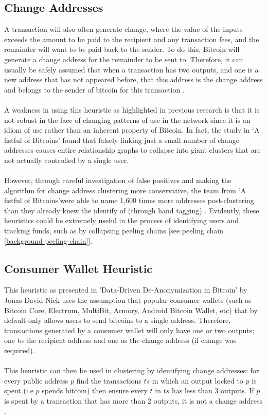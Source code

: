 \subsection{Change Addresses}\label{background:cluster-change-address}
A transaction will also often generate change, where the value of the inputs exceeds the amount to be paid to the recipient and any transaction fees, and the remainder will want to be paid back to the sender. To do this, Bitcoin will generate a change address for the remainder to be sent to. Therefore, it can usually be safely assumed that when a transaction has two outputs, and one is a new address that has not appeared before, that this address is the change address and belongs to the sender of bitcoin for this transaction \cite{RefWorks:doc:5c3de14be4b042abd3bcc2c6}. 
\\\\
A weakness in using this heuristic as highlighted in previous research \cite{Refworks:doc:5c3de7e3e4b0ea6196452d80} is that it is not robust in the face of changing patterns of use in the network since it is an idiom of use rather than an inherent property of Bitcoin. In fact, the study in \lq A fistful of Bitcoins\rq  \cite{Refworks:doc:5c3de7e3e4b0ea6196452d80} found that falsely linking just a small number of change addresses causes entire relationship graphs to collapse into giant clusters that are not actually controlled by a single user. 
\\\\
However, through careful investigation of false positives and making the algorithm for change address clustering more conservative, the team from \lq A fistful of Bitcoins\rq were able to name 1,600 times more addresses post-clustering than they already knew the identify of (through hand tagging) \cite{Refworks:doc:5c3de7e3e4b0ea6196452d80}. Evidently, these heuristics could be extremely useful in the process of identifying users and tracking funds, such as by collapsing peeling chains [see peeling chain \ref{background-peeling-chain}].

\subsection{Consumer Wallet Heuristic}\label{background:consumer-wallet-heuristic}
This heuristic as presented in 'Data-Driven De-Anonymization in Bitcoin' by Jonas David Nick \cite{RefWorks:doc:5cfa2acee4b0132e0223d6f7} uses the assumption that popular consumer wallets (such as  Bitcoin Core, Electrum, MultiBit, Armory, Android Bitcoin Wallet, etc) that by default only allows users to send bitcoins to a single address. Therefore, transactions generated by a consumer wallet will only have one or two outputs; one to the recipient address and one as the change address (if change was required). 
\\\\
This heuristic can then be used in clustering by identifying change addresses: for every public address $p$ find the transactions $ts$ in which an output locked to $p$ is spent (i.e $p$ spends bitcoin) then ensure every $t$ in $ts$ has less than 3 outputs. If $p$ is spent by a transaction that has more than 2 outputs, it is not a change address \cite{RefWorks:doc:5cfa2acee4b0132e0223d6f7} . 


